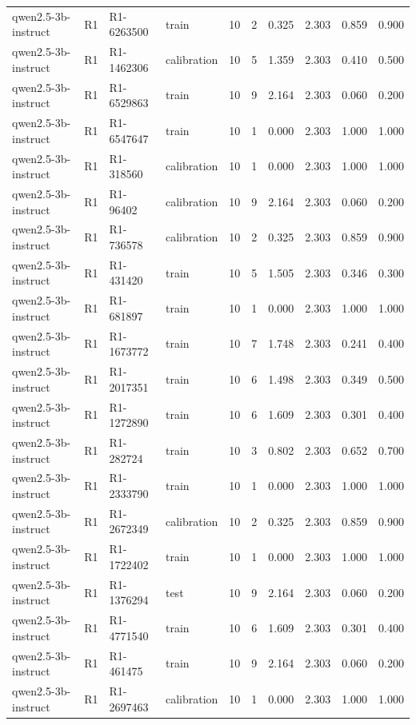 \begin{table}
\begin{tabular}{llllrrrrrr}
qwen2.5-3b-instruct & R1 & R1-6263500 & train & 10 & 2 & 0.325 & 2.303 & 0.859 & 0.900 \\
qwen2.5-3b-instruct & R1 & R1-1462306 & calibration & 10 & 5 & 1.359 & 2.303 & 0.410 & 0.500 \\
qwen2.5-3b-instruct & R1 & R1-6529863 & train & 10 & 9 & 2.164 & 2.303 & 0.060 & 0.200 \\
qwen2.5-3b-instruct & R1 & R1-6547647 & train & 10 & 1 & 0.000 & 2.303 & 1.000 & 1.000 \\
qwen2.5-3b-instruct & R1 & R1-318560 & calibration & 10 & 1 & 0.000 & 2.303 & 1.000 & 1.000 \\
qwen2.5-3b-instruct & R1 & R1-96402 & calibration & 10 & 9 & 2.164 & 2.303 & 0.060 & 0.200 \\
qwen2.5-3b-instruct & R1 & R1-736578 & calibration & 10 & 2 & 0.325 & 2.303 & 0.859 & 0.900 \\
qwen2.5-3b-instruct & R1 & R1-431420 & train & 10 & 5 & 1.505 & 2.303 & 0.346 & 0.300 \\
qwen2.5-3b-instruct & R1 & R1-681897 & train & 10 & 1 & 0.000 & 2.303 & 1.000 & 1.000 \\
qwen2.5-3b-instruct & R1 & R1-1673772 & train & 10 & 7 & 1.748 & 2.303 & 0.241 & 0.400 \\
qwen2.5-3b-instruct & R1 & R1-2017351 & train & 10 & 6 & 1.498 & 2.303 & 0.349 & 0.500 \\
qwen2.5-3b-instruct & R1 & R1-1272890 & train & 10 & 6 & 1.609 & 2.303 & 0.301 & 0.400 \\
qwen2.5-3b-instruct & R1 & R1-282724 & train & 10 & 3 & 0.802 & 2.303 & 0.652 & 0.700 \\
qwen2.5-3b-instruct & R1 & R1-2333790 & train & 10 & 1 & 0.000 & 2.303 & 1.000 & 1.000 \\
qwen2.5-3b-instruct & R1 & R1-2672349 & calibration & 10 & 2 & 0.325 & 2.303 & 0.859 & 0.900 \\
qwen2.5-3b-instruct & R1 & R1-1722402 & train & 10 & 1 & 0.000 & 2.303 & 1.000 & 1.000 \\
qwen2.5-3b-instruct & R1 & R1-1376294 & test & 10 & 9 & 2.164 & 2.303 & 0.060 & 0.200 \\
qwen2.5-3b-instruct & R1 & R1-4771540 & train & 10 & 6 & 1.609 & 2.303 & 0.301 & 0.400 \\
qwen2.5-3b-instruct & R1 & R1-461475 & train & 10 & 9 & 2.164 & 2.303 & 0.060 & 0.200 \\
qwen2.5-3b-instruct & R1 & R1-2697463 & calibration & 10 & 1 & 0.000 & 2.303 & 1.000 & 1.000 \\

\end{tabular}
\end{table}
